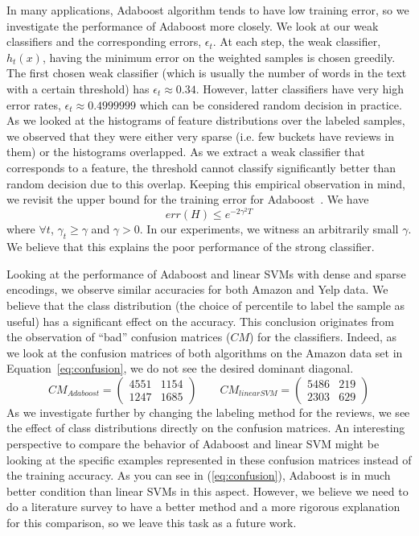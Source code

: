 \documentclass[letterpaper]{article}
\begin{document}
In many applications, Adaboost algorithm tends to have low training
error, so we investigate the performance of Adaboost more closely. We
look at our weak classifiers and the corresponding errors,
$\epsilon_t$. At each step, the weak classifier, $h_t(x)$, having the
minimum error on the weighted samples is chosen greedily. The first
chosen weak classifier (which is usually the number of words in the
text with a certain threshold) has $\epsilon_t \approx 0.34$. However,
latter classifiers have very high error rates, $\epsilon_t \approx
0.4999999$ which can be considered random decision in practice. As we
looked at the histograms of feature distributions over the labeled
samples, we observed that they were either very sparse (i.e. few
buckets have reviews in them) or the histograms overlapped. As we
extract a weak classifier that corresponds to a feature, the threshold
cannot classify significantly better than random decision due to this
overlap. Keeping this empirical observation in mind, we revisit the
upper bound for the training error for
Adaboost~\cite{adaboost,adaboost2}. We have
\[
err(H) \leq e^{-2\gamma^2 T}
\]
where $\forall t$, $\gamma_t \geq \gamma $ and $\gamma > 0$. In our
experiments, we witness an arbitrarily small $\gamma$. We believe that
this explains the poor performance of the strong classifier.

Looking at the performance of Adaboost and linear SVMs with dense and
sparse encodings, we observe similar accuracies for both Amazon and
Yelp data. We believe that the class distribution (the choice of
percentile to label the sample as useful) has a significant effect on
the accuracy. This conclusion originates from the observation of
``bad'' confusion matrices ($CM$) for the classifiers. Indeed, as we
look at the confusion matrices of both algorithms on the Amazon data
set in Equation~\ref{eq:confusion}, we do not see the desired dominant
diagonal.
\begin{equation}
\label{eq:confusion}
CM_{Adaboost} = \left(
\begin{matrix}
4551 & 1154\\
1247 & 1685
\end{matrix}
\right)
\qquad
CM_{linearSVM} = \left(
\begin{matrix}
5486 & 219\\
2303 & 629
\end{matrix}
\right)
\end{equation}
As we investigate further by changing the labeling method
for the reviews, we see the effect of class distributions directly on
the confusion matrices. An interesting perspective to compare the
behavior of Adaboost and linear SVM might be looking at the specific
examples represented in these confusion matrices instead of the training
accuracy. As you can see in (\ref{eq:confusion}), Adaboost is in much
better condition than linear SVMs in this aspect. However, we believe
we need to do a literature survey to have a better method and a more
rigorous explanation
for this comparison, so we leave this task as a future work.
\end{document}
